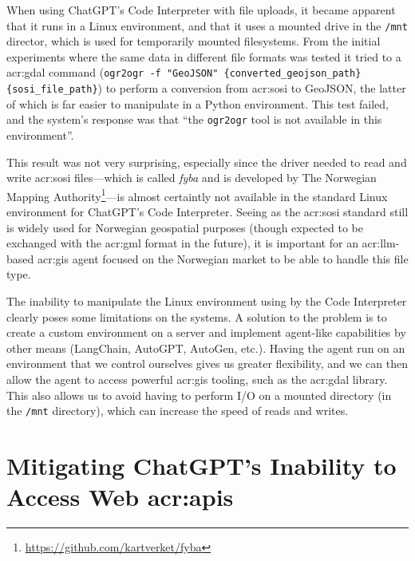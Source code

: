 When using ChatGPT's Code Interpreter with file uploads, it became apparent that it runs in a Linux environment, and that it uses a mounted drive  in the \texttt{/mnt} director, which is used for temporarily mounted filesystems. From the initial experiments where the same data in different file formats was tested it tried to a \acrshort{acr:gdal} command (\texttt{ogr2ogr -f "GeoJSON" \{converted\_geojson\_path\} \{sosi\_file\_path\}}) to perform a conversion from \acrshort{acr:sosi} to GeoJSON, the latter of which is far easier to manipulate in a Python environment. This test failed, and the system's response was that \enquote{the \texttt{ogr2ogr} tool is not available in this environment}.

This result was not very surprising, especially since the driver needed to read and write \acrshort{acr:sosi} files---which is called \textit{fyba} and is developed by The Norwegian Mapping Authority\footnote{\url{https://github.com/kartverket/fyba}}---is almost certaintly not available in the standard Linux environment for ChatGPT's Code Interpreter. Seeing as the \acrshort{acr:sosi} standard still is widely used for Norwegian geospatial purposes (though expected to be exchanged with the \acrshort{acr:gml} format in the future), it is important for an \acrshort{acr:llm}-based \acrshort{acr:gis} agent focused on the Norwegian market to be able to handle this file type.

The inability to manipulate the Linux environment using by the Code Interpreter clearly poses some limitations on the systems. A solution to the problem is to create a custom environment on a server and implement agent-like capabilities by other means (LangChain, AutoGPT, AutoGen, etc.). Having the agent run on an environment that we control ourselves gives us greater flexibility, and we can then allow the agent to access powerful \acrshort{acr:gis} tooling, such as the \acrshort{acr:gdal} library. This also allows us to avoid having to perform I/O on a mounted directory (in the \texttt{/mnt} directory), which can increase the speed of reads and writes.

\section[Mitigating ChatGPT's Inability to Access Web APIs]{Mitigating ChatGPT's Inability to Access Web \acrshort{acr:api}s}\label{sec:api-access-discussion}

